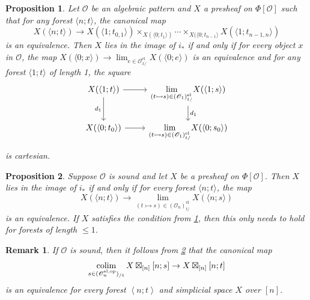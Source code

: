 \documentclass[10pt,a4paper]{amsart}
\newtheorem{remark}{Remark}
\newtheorem{proposition}{Proposition}
\newcommand{\Forest}{\Phi}
\renewcommand{\O}{\mathscr{O}}
\newcommand{\cO}{\O}
\def\colim{\qopname\relax m{colim}}
\newcommand{\el}{\mathrm{el}}
\newcommand{\elem}{\el}
\newcommand{\intarrow}{\rightarrowtail}
\newcommand{\op}{\mathrm{op}}
\begin{document}
\begin{proposition}\label{prop:RKan-trees-to-forests-simplified}
    Let $\cO$ be an algebraic pattern and $X$ a presheaf on $\Forest[\cO]$ such that for any forest $\langle n;t \rangle$, the canonical map
    \[X(\langle n;t \rangle) \to X(\langle 1;t_{0,1} \rangle) \times_{X(\langle 0;t_1 \rangle)} \cdots \times_{X(\langle 0;t_{n-1} \rangle} X(\langle 1;t_{n-1,n} \rangle)\]
    is an equivalence.
    Then $X$ lies in the image of $i_*$ if and only if for every object $x$ in $\cO$, the map $X(\langle 0;x \rangle) \to \lim_{e \in \cO^\elem_{x/}} X(\langle 0;e \rangle)$ is an equivalence and for any forest $\langle 1;t \rangle$ of length 1, the square
    \[\begin{tikzcd}[ampersand replacement=\&]
    	{X(\langle 1;t \rangle)} \& {{\lim\limits_{(t \intarrow s) \in(\cO_1)^\elem_{t/}}} X(\langle 1;s \rangle)} \\
    	{X(\langle 0;t_0 \rangle)} \& {{\lim\limits_{(t \intarrow s) \in(\cO_1)^\elem_{t/}}} X(\langle 0;s_0 \rangle)}
    	\arrow[from=1-1, to=1-2]
    	\arrow["{d_1}"', from=1-1, to=2-1]
    	\arrow["{d_1}", from=1-2, to=2-2]
    	\arrow[from=2-1, to=2-2]
    \end{tikzcd}\]
    is cartesian.
\end{proposition}

\begin{proposition}\label{prop:RKan-trees-to-forest-sound}
    Suppose $\cO$ is sound and let $X$ be a presheaf on $\Forest[\cO]$. Then $X$ lies in the image of $i_*$ if and only if for every forest $\langle n;t \rangle$, the map
    \[X(\langle n;t \rangle) \to \lim\limits_{(t \intarrow s) \in (\cO_{n})^\elem_{t/}} X(\langle n;s \rangle)\]
    is an equivalence.
    If $X$ satisfies the condition from \cref{prop:RKan-trees-to-forests-simplified}, then this only needs to hold for forests of length $\leq 1$.
\end{proposition}

\begin{remark}\label{rem:forest decomposition sound}
    If $\O$ is sound, then it follows from \cref{prop:RKan-trees-to-forest-sound} that the canonical map 
    $$
    \colim_{s\in(\O^{\el,\op}_n)_{/t}} X \boxtimes_{[n]} [n;s] \to X \boxtimes_{[n]} [n;t]
    $$
    is an equivalence for every forest $\left<n;t\right>$ and simplicial space $X$ over $[n]$.
\end{remark}
\end{document}
